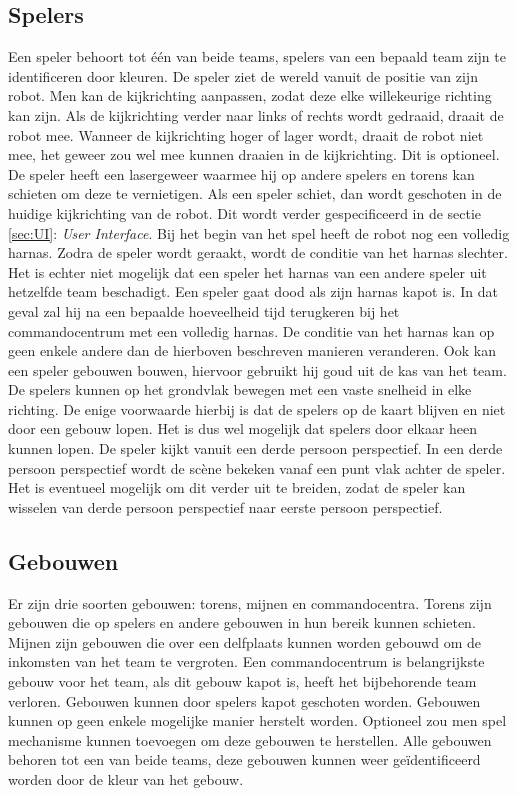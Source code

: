 \subsection{Spelers}
Een speler behoort tot \'e\'en van beide teams, spelers van een bepaald team zijn te identificeren door kleuren. De speler ziet de wereld vanuit de positie van zijn robot. Men kan de kijkrichting aanpassen, zodat deze elke willekeurige richting kan zijn. Als de kijkrichting verder naar links of rechts wordt gedraaid, draait de robot mee. Wanneer de kijkrichting hoger of lager wordt, draait de robot niet mee, het geweer zou wel mee kunnen draaien in de kijkrichting. Dit is optioneel. De speler heeft een lasergeweer waarmee hij op andere spelers en torens kan schieten om deze te vernietigen. Als een speler schiet, dan wordt geschoten in de huidige kijkrichting van de robot. Dit wordt verder gespecificeerd in de sectie \ref{sec:UI}:\emph{ User Interface}. Bij het begin van het spel heeft de robot nog een volledig harnas. Zodra de speler wordt geraakt, wordt de conditie van het harnas slechter. Het is echter niet mogelijk dat een speler het harnas van een andere speler uit hetzelfde team beschadigt.
\FloatBarrier
Een speler gaat dood als zijn harnas kapot is. In dat geval zal hij na een bepaalde hoeveelheid tijd terugkeren bij het commandocentrum met een volledig harnas. De conditie van het harnas kan op geen enkele andere dan de hierboven beschreven manieren veranderen. Ook kan een speler gebouwen bouwen, hiervoor gebruikt hij goud uit de kas van het team. De spelers kunnen op het grondvlak bewegen met een vaste snelheid in elke richting. De enige voorwaarde hierbij is dat de spelers op de kaart blijven en niet door een gebouw lopen. Het is dus wel mogelijk dat spelers door elkaar heen kunnen lopen. De speler kijkt vanuit een derde persoon perspectief. In een derde persoon perspectief wordt de sc\`ene bekeken vanaf een punt vlak achter de speler.
Het is eventueel mogelijk om dit verder uit te breiden, zodat de speler kan wisselen van derde persoon perspectief naar eerste persoon perspectief.

\subsection{Gebouwen}
Er zijn drie soorten gebouwen: torens, mijnen en commandocentra. Torens zijn gebouwen die op spelers en andere gebouwen in hun bereik kunnen schieten. Mijnen  zijn gebouwen die over een delfplaats kunnen worden gebouwd om de inkomsten van het team te vergroten. Een commandocentrum is belangrijkste gebouw voor het team, als dit gebouw kapot is, heeft het bijbehorende team verloren. Gebouwen kunnen door spelers kapot geschoten worden. Gebouwen kunnen op geen enkele mogelijke manier herstelt worden. Optioneel zou men spel mechanisme kunnen toevoegen om deze gebouwen te herstellen. Alle gebouwen behoren tot een van beide teams, deze gebouwen kunnen weer ge\"identificeerd worden door de kleur van het gebouw.

